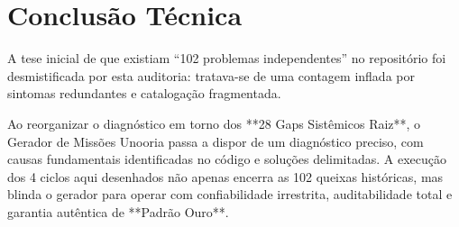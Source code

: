 \documentclass[11pt,a4paper]{article}
\begin{document}
\section{Conclusão Técnica}

A tese inicial de que existiam ``102 problemas independentes'' no repositório foi desmistificada por esta auditoria: tratava-se de uma contagem inflada por sintomas redundantes e catalogação fragmentada.

Ao reorganizar o diagnóstico em torno dos **28 Gaps Sistêmicos Raiz**, o Gerador de Missões Unooria passa a dispor de um diagnóstico preciso, com causas fundamentais identificadas no código e soluções delimitadas. A execução dos 4 ciclos aqui desenhados não apenas encerra as 102 queixas históricas, mas blinda o gerador para operar com confiabilidade irrestrita, auditabilidade total e garantia autêntica de **Padrão Ouro**.
\end{document}
